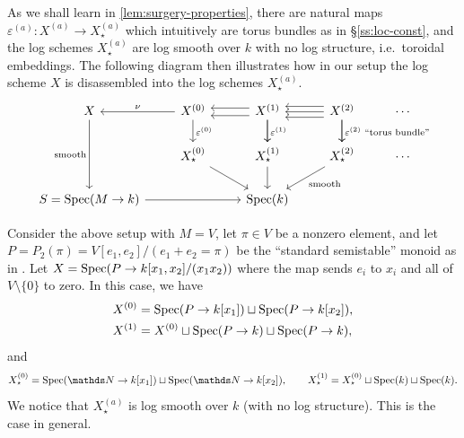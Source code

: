 \begin{rmk}
As we shall learn in \cref{lem:surgery-properties}, there are natural maps $\varepsilon^{(a)}\colon X^{(a)}\to X^{(a)}_\star$ which intuitively are torus bundles as in \S\ref{ss:loc-const}, and the log schemes $X^{(a)}_\star$ are log smooth over $k$ with no log structure, i.e.\ toroidal embeddings. The following diagram then illustrates how in our setup the log scheme $X$ is disassembled into the log schemes $X_\star^{(a)}$. 
\[
    \begin{tikzcd}
        X \ar[dd,"\text{smooth}",swap] & X^{(0)} \ar[l,swap,"\nu"] \ar[d,"\varepsilon^{(0)}"] & \ar[l,shift right=0.7ex] \ar[l,shift left=0.7ex] X^{(1)} \ar[d,"\varepsilon^{(1)}"] \ar[d] & \ar[l,shift right=1ex] \ar[l,shift left=1ex] \ar[l] X^{(2)} \ar[d] \ar[d,"\varepsilon^{(2)}\text{ ``torus bundle''}"] & \cdots\\
        & X^{(0)}_\star \ar[dr] & X^{(1)}_\star \ar[d] & X^{(2)}_\star \ar[dl,"\text{smooth}"] & \cdots \\
        S = \Spec(M\to k) \ar[rr] & & \Spec(k)
    \end{tikzcd}
\]
\end{rmk}

\begin{ex} \label{ex:semistable-log-curve}
    Consider the above setup with $M=V$, let $\pi\in V$ be a nonzero element, and let $P= P_2(\pi) = V[e_1,e_2]/(e_1+e_2=\pi)$ be the ``standard semistable'' monoid as in \cite[Example~2.4.5]{AHLS-Log}. Let $X = \operatorname{Spec}(P\to k[x_1,x_2]/(x_1x_2))$ where the map sends $e_i$ to $x_i$ and all of $V\setminus \{0\}$ to zero. In this case, we have 
    \begin{align*}
        X^{(0)} & = \operatorname{Spec}(P\to k[x_1]) \sqcup \operatorname{Spec}(P\to k[x_2]), \\
        X^{(1)} & = X^{(0)} \sqcup \operatorname{Spec}(P\to k) \sqcup \operatorname{Spec}(P\to k),
    \end{align*}
    and 
    \[
        X^{(0)}_\star  = \Spec(\bN\to k[x_1]) \sqcup \Spec(\bN\to k[x_2]),
        \qquad 
        X^{(1)}_\star = X^{(0)}_\star \sqcup \Spec(k) \sqcup \Spec(k).
    \]
    We notice that $X^{(a)}_\star$ is log smooth over $k$ (with no log structure). This is the case in general.
\end{ex}

